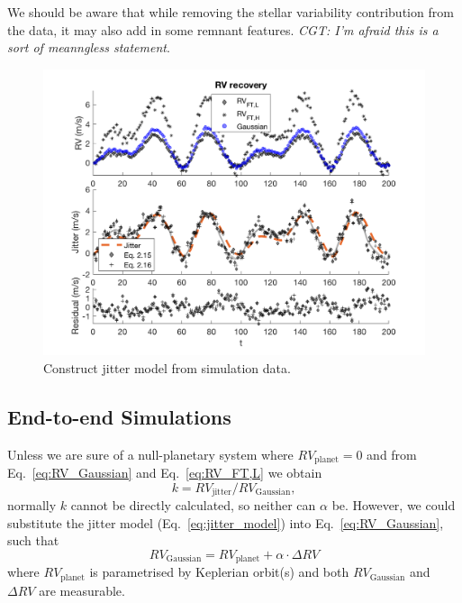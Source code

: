 We should be aware that 
while removing the stellar variability contribution from the data, it may also add in some remnant features. 
{\em CGT: I'm afraid this is a sort of meanngless statement}.

\begin{figure}[tbp]
\centering
\includegraphics[width = 0.99 \linewidth]
{./Figures/Methods/5-PLANET_AND_JITTER.png}
\caption[Jitter model]
{Construct jitter model from simulation data.}
\label{fig:PLANET_AND_JITTER}
\end{figure} 


\subsection{End-to-end Simulations}

Unless we are sure of a null-planetary system where $RV_\text{planet} = 0$ and
from Eq.~\ref{eq:RV_Gaussian} and Eq.~\ref{eq:RV_FT,L} we obtain
\begin{equation}
	k = RV_\text{jitter} / RV_\text{Gaussian},
\end{equation} 
normally $k$ cannot be directly calculated, so neither can $\alpha$ be.
However, we could substitute the jitter model (Eq.~\ref{eq:jitter_model}) into Eq.~\ref{eq:RV_Gaussian}, such that
\begin{equation}
	RV_\text{Gaussian} = RV_\text{planet} + \alpha \cdot \Delta RV
\label{eq:RV_fit}
\end{equation}
where $RV_\text{planet}$ is parametrised by Keplerian orbit(s) and both $RV_\text{Gaussian}$ and $\Delta RV$ 
are measurable. 

